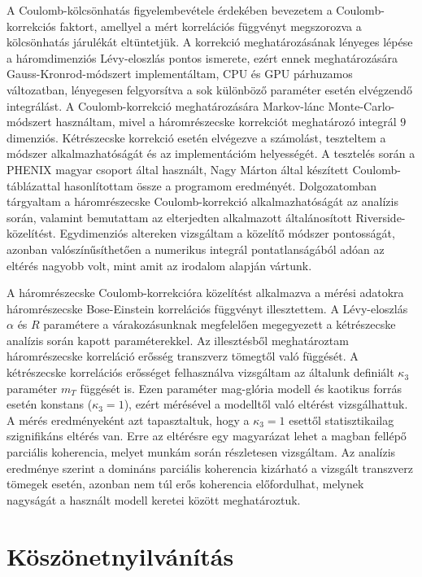 \documentclass[11pt,a4paper]{article}
\numberwithin{equation}{subsection}
\numberwithin{figure}{section}
\begin{document}
A Coulomb-kölcsönhatás figyelembevétele érdekében bevezetem a Coulomb-korrekciós faktort, amellyel a mért korrelációs függvényt megszorozva a kölcsönhatás járulékát eltüntetjük. A korrekció meghatározásának lényeges lépése a háromdimenziós Lévy-eloszlás pontos ismerete, ezért ennek meghatározására Gauss-Kronrod-módszert implementáltam, CPU és GPU párhuzamos változatban, lényegesen felgyorsítva a sok különböző paraméter esetén elvégzendő integrálást. A Coulomb-korrekció meghatározására Markov-lánc Monte-Carlo-módszert használtam, mivel a háromrészecske korrekciót meghatározó integrál $9$ dimenziós. Kétrészecske korrekció esetén elvégezve a számolást, teszteltem a módszer alkalmazhatóságát és az implementációm helyességét. A tesztelés során a PHENIX magyar csoport  által használt, Nagy Márton által készített Coulomb-táblázattal hasonlítottam össze a programom eredményét. Dolgozatomban tárgyaltam a háromrészecske Coulomb-korrekció alkalmazhatóságát az analízis során, valamint bemutattam az elterjedten alkalmazott általánosított Riverside-közelítést. Egydimenziós altereken vizsgáltam a közelítő módszer pontosságát, azonban valószínűsíthetően a numerikus integrál pontatlanságából adóan az eltérés nagyobb volt, mint amit az irodalom alapján vártunk.


A háromrészecske Coulomb-korrekcióra közelítést alkalmazva a mérési adatokra háromrészecske Bose-Einstein korrelációs függvényt illesztettem. A Lévy-eloszlás $\alpha$ és $R$ paramétere a várakozásunknak megfelelően megegyezett a kétrészecske analízis során kapott paraméterekkel. Az illesztésből meghatároztam háromrészecske korreláció erősség transzverz tömegtől való függését. A kétrészecske korrelációs erősséget felhasználva vizsgáltam az általunk definiált $\kappa_3$ paraméter $m_T$ függését is. Ezen paraméter mag-glória modell és kaotikus forrás esetén konstans ($\kappa_3=1$), ezért mérésével a modelltől való eltérést vizsgálhattuk. A mérés eredményeként azt tapasztaltuk, hogy  a $\kappa_3=1$ esettől statisztikailag szignifikáns eltérés van. Erre az eltérésre egy magyarázat lehet a magban fellépő parciális koherencia, melyet munkám során részletesen vizsgáltam. Az analízis eredménye szerint a domináns parciális koherencia kizárható a vizsgált transzverz tömegek esetén, azonban nem túl erős koherencia előfordulhat, melynek nagyságát a használt modell keretei között meghatároztuk.

\vspace*{1cm}

\section*{Köszönetnyilvánítás}
\end{document}
